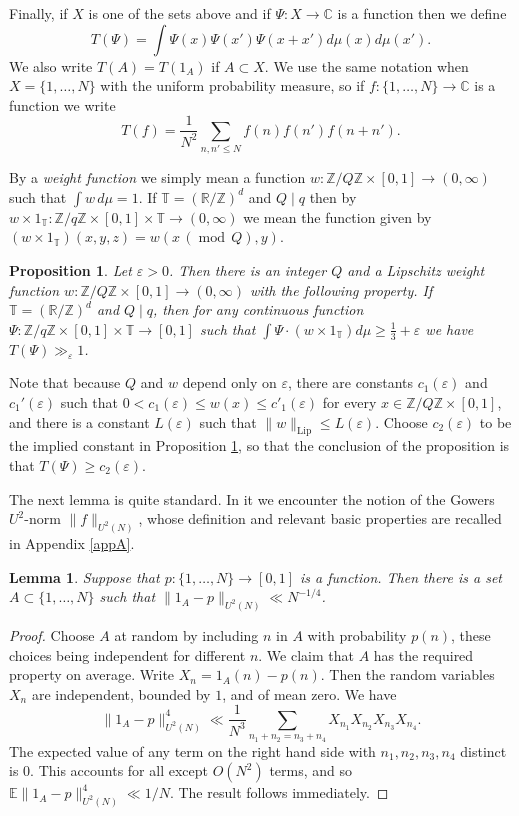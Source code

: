 \documentclass[10pt,reqno]{amsart}
\newtheorem{lemma}[theorem]{Lemma}
\newtheorem{proposition}[theorem]{Proposition}
\theoremstyle{definition}
\theoremstyle{remark}
\newcommand{\md}[1]{\ensuremath{\,(\operatorname{mod}\, #1)}}
\renewcommand{\leq}{\leqslant}
\renewcommand{\geq}{\geqslant}
\newcommand\Lip{\operatorname{Lip}}
\def\R{\mathbb{R}}
\def\C{\mathbb{C}}
\def\Z{\mathbb{Z}}
\def\E{\mathbb{E}}
\def\T{\mathbb{T}}
\def\eps{\varepsilon}
\numberwithin{equation}{section}
\begin{document}
Finally, if $X$ is one of the sets above and if $\Psi : X \to \C$ is a function then we define 
\begin{equation}\label{t-def}T(\Psi) = \int \Psi(x) \Psi(x') \Psi(x + x') d\mu(x) d\mu(x').\end{equation}
We also write $T(A) = T(1_A)$ if $A \subset X$. We use the same notation when $X = \{1,\dots, N\}$ with the uniform probability measure, so if $f : \{1,\dots, N\} \rightarrow \C$ is a function we write
\begin{equation}\label{t-N-def} T(f) = \frac{1}{N^2} \sum_{n , n' \leq N} f(n) f(n') f(n + n').\end{equation}

By a \emph{weight function} we simply mean a function $w:\Z/Q\Z\times[0,1]\to(0,\infty)$ such that $\int w\,d\mu = 1$. If $\T=(\R/\Z)^d$ and $Q\mid q$ then by $w\times 1_{\T} : \Z/q\Z\times[0,1]\times\T\to(0,\infty)$ we mean the function given by $(w\times1_{\T})(x,y,z) = w(x\md{Q},y)$.

\begin{proposition}\label{nu-exist-3} Let $\eps > 0$. Then there is an integer $Q$ and a Lipschitz weight function $w : \Z/Q\Z \times [0,1] \to (0,\infty)$ with the following property. If $\T = (\R/\Z)^d$ and $Q\mid q$, then for any continuous function $\Psi : \Z/q\Z \times [0,1] \times \T \to [0,1]$ such that $\int \Psi \cdot (w \times 1_{\T}) d\mu \geq \frac{1}{3} + \eps$ we have $T(\Psi) \gg_\eps 1$.
\end{proposition}

Note that because $Q$ and $w$ depend only on $\eps$, there are constants $c_1(\eps)$ and $c_1'(\eps)$ such that $0<c_1(\eps)\leq w(x) \leq c'_1(\eps)$ for every $x\in\Z/Q\Z\times[0,1]$, and there is a constant $L(\eps)$ such that $\|w\|_{\Lip}\leq L(\eps)$. Choose $c_2(\eps)$ to be the implied constant in Proposition \ref{nu-exist-3}, so that the conclusion of the proposition is that $T(\Psi)\geq c_2(\eps)$.

The next lemma is quite standard. In it we encounter the notion of the Gowers $U^2$-norm $\|f\|_{U^2(N)}$, whose definition and relevant basic properties are recalled in Appendix \ref{appA}.

\begin{lemma}\label{random-sample}
Suppose that $p : \{1,\dots,N\} \rightarrow [0,1]$ is a function. Then there is a set $A \subset \{1,\ldots,N\}$ such that $\| 1_A - p \|_{U^2(N)} \ll N^{-1/4}$.
\end{lemma}
\begin{proof}
Choose $A$ at random by including $n$ in $A$ with probability $p(n)$, these choices being independent for different $n$. We claim that $A$ has the required property on average. Write $X_n = 1_A(n) - p(n)$. Then the random variables $X_n$ are independent, bounded by $1$, and of mean zero. We have
\[ \| 1_A - p \|_{U^2(N)}^4 \ll \frac{1}{N^3} \sum_{n_1 + n_2 = n_3 + n_4} X_{n_1} X_{n_2} X_{n_3} X_{n_4}.\]
The expected value of any term on the right hand side with $n_1, n_2, n_3, n_4$ distinct is $0$. This accounts for all except $O(N^2)$ terms, and so $\E \| 1_A - p \|_{U^2(N)}^4 \ll 1/N$. The result follows immediately. 
\end{proof}
\end{document}
